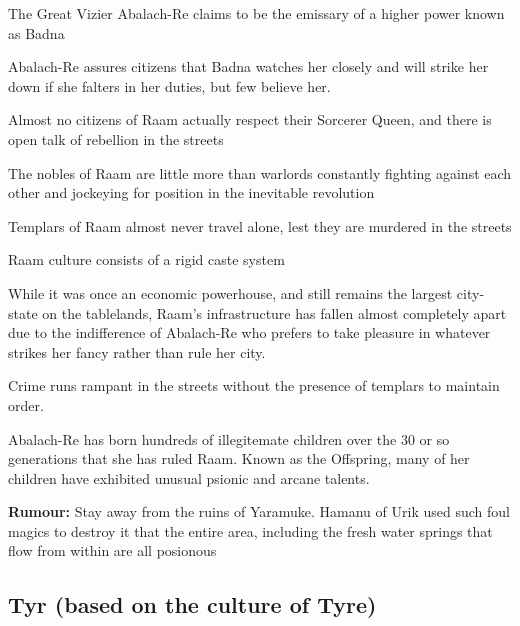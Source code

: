 \begin{description}
    \item The Great Vizier Abalach-Re claims to be the emissary of a higher power known as Badna
    \item Abalach-Re assures citizens that Badna watches her closely and will strike her down if she falters in her duties, but few believe her.
    \item Almost no citizens of Raam actually respect their Sorcerer Queen, and there is open talk of rebellion in the streets
    \item The nobles of Raam are little more than warlords constantly fighting against each other and jockeying for position in the inevitable revolution
    \item Templars of Raam almost never travel alone, lest they are murdered in the streets
    \item Raam culture consists of a rigid caste system
    \item While it was once an economic powerhouse, and still remains the largest city-state on the tablelands, Raam’s infrastructure has fallen almost completely apart due to the indifference of Abalach-Re who prefers to take pleasure in whatever strikes her fancy rather than rule her city.
    \item Crime runs rampant in the streets without the presence of templars to maintain order.
    \item Abalach-Re has born hundreds of illegitemate children over the 30 or so generations that she has ruled Raam. Known as the Offspring, many of her children have exhibited unusual psionic and arcane talents.
    \item \textbf{Rumour:} Stay away from the ruins of Yaramuke. Hamanu of Urik used such foul magics to destroy it that the entire area, including the fresh water springs that flow from within are all posionous
\end{description}

\subsection{Tyr (based on the culture of Tyre)}

